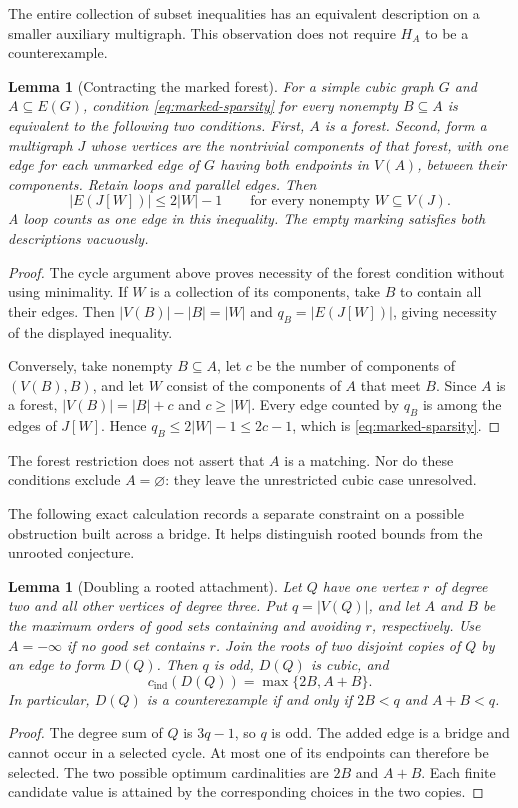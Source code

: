 \documentclass[11pt]{article}
\newtheorem{lemma}[theorem]{Lemma}
\newcommand{\cind}{c_{\mathrm{ind}}}
\begin{document}
The entire collection of subset inequalities has an equivalent
description on a smaller auxiliary multigraph. This observation
does not require $H_A$ to be a counterexample.

\begin{lemma}[Contracting the marked forest]\label{lem:marked-quotient}
For a simple cubic graph $G$ and $A\subseteq E(G)$, condition
\eqref{eq:marked-sparsity} for every nonempty $B\subseteq A$
is equivalent to the following two conditions. First, $A$ is a
forest. Second, form a multigraph $J$ whose vertices are the
nontrivial components of that forest, with one edge for each
unmarked edge of $G$ having both endpoints in $V(A)$, between
their components. Retain loops and parallel edges. Then
\[
 |E(J[W])|\leq2|W|-1\qquad
 \text{for every nonempty }W\subseteq V(J).
\]
A loop counts as one edge in this inequality. The empty marking
satisfies both descriptions vacuously.
\end{lemma}
\begin{proof}
The cycle argument above proves necessity of the forest condition
without using minimality. If $W$ is a collection of its components,
take $B$ to contain all their edges. Then
$|V(B)|-|B|=|W|$ and $q_B=|E(J[W])|$, giving necessity of the
displayed inequality.

Conversely, take nonempty $B\subseteq A$, let $c$ be the number
of components of $(V(B),B)$, and let $W$ consist of the components
of $A$ that meet $B$. Since $A$ is a forest, $|V(B)|=|B|+c$
and $c\geq|W|$. Every edge counted by $q_B$ is among the edges
of $J[W]$. Hence
$q_B\leq2|W|-1\leq2c-1$, which is
\eqref{eq:marked-sparsity}.
\end{proof}

The forest restriction does not assert that $A$ is a matching.
Nor do these conditions exclude $A=\varnothing$: they leave the
unrestricted cubic case unresolved.

The following exact calculation records a separate constraint on a
possible obstruction built across a bridge. It helps distinguish
rooted bounds from the unrooted conjecture.

\begin{lemma}[Doubling a rooted attachment]\label{lem:double}
Let $Q$ have one vertex $r$ of degree two and all other vertices of
degree three. Put $q=|V(Q)|$, and let $A$ and $B$ be the maximum
orders of good sets containing and avoiding $r$, respectively.
Use $A=-\infty$ if no good set contains $r$.
Join the roots of two disjoint copies of $Q$ by an edge to form $D(Q)$.
Then $q$ is odd, $D(Q)$ is cubic, and
\[
 \cind(D(Q))=\max\{2B,A+B\}.
\]
In particular, $D(Q)$ is a counterexample if and only if
$2B<q$ and $A+B<q$.
\end{lemma}
\begin{proof}
The degree sum of $Q$ is $3q-1$, so $q$ is odd. The added edge is a
bridge and cannot occur in a selected cycle. At most one of its
endpoints can therefore be selected. The two possible optimum
cardinalities are $2B$ and $A+B$. Each finite candidate value is
attained by the corresponding choices in the two copies.
\end{proof}
\end{document}
